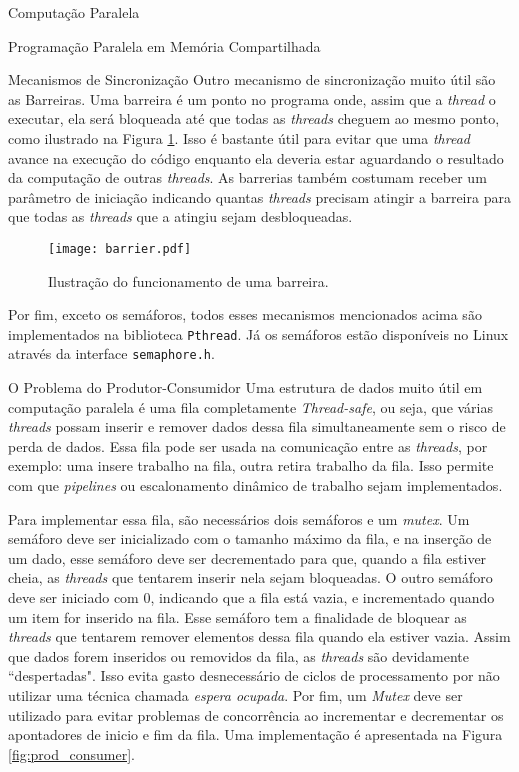 \begin{section}{Computação Paralela}
\begin{subsection}{Programação Paralela em Memória Compartilhada}
\begin{subsubsection}{Mecanismos de Sincronização}
Outro mecanismo de sincronização muito útil são as Barreiras. Uma barreira
é um ponto no programa onde, assim que a \textit{thread} o executar, ela
será bloqueada até que todas as \textit{threads} cheguem ao mesmo ponto, como
ilustrado na Figura \ref{fig:barrier}.
Isso é bastante útil para evitar que uma \textit{thread} avance na execução
do código enquanto ela deveria estar aguardando o resultado da computação
de outras \textit{threads}. As barrerias também costumam receber um parâmetro
de iniciação indicando quantas \textit{threads} precisam atingir a
barreira para que todas as \textit{threads} que a atingiu sejam desbloqueadas.

\begin{figure}[ht]
 \centering
 \texttt{[image: barrier.pdf]}
 \caption{Ilustração do funcionamento de uma barreira.}
 \label{fig:barrier}
\end{figure}


Por fim, exceto os semáforos, todos esses mecanismos mencionados acima são
implementados na biblioteca \texttt{Pthread}. Já os semáforos estão disponíveis
no Linux através da interface \texttt{semaphore.h}.

\end{subsubsection}

\begin{subsubsection}{O Problema do Produtor-Consumidor}
    Uma estrutura de dados muito útil em computação paralela
é uma fila completamente \textit{Thread-safe}, ou seja,
que várias \textit{threads} possam inserir e remover dados dessa
fila simultaneamente sem o risco de perda de dados. Essa fila
pode ser usada na comunicação entre as \textit{threads}, por
exemplo: uma insere trabalho na fila, outra retira trabalho da
fila. Isso permite com que \textit{pipelines} ou escalonamento
dinâmico de trabalho sejam implementados.

Para implementar essa fila, são necessários dois semáforos e um
\textit{mutex}. Um semáforo deve ser inicializado com o tamanho máximo
da fila, e na inserção de um dado, esse semáforo deve ser decrementado
para que, quando a fila estiver cheia, as \textit{threads} que tentarem
inserir nela sejam bloqueadas. O outro semáforo deve ser iniciado com
0, indicando que a fila está vazia, e incrementado quando um item for
inserido na fila. Esse semáforo tem a finalidade de
bloquear as \textit{threads} que tentarem remover elementos dessa
fila quando ela estiver vazia. Assim que dados forem inseridos ou removidos
da fila, as \textit{threads} são devidamente ``despertadas". Isso evita gasto
desnecessário de ciclos de processamento por não utilizar uma técnica
chamada \textit{espera ocupada}. Por fim, um \textit{Mutex} deve ser
utilizado para evitar problemas de concorrência ao incrementar e
decrementar os apontadores de inicio e fim da fila. Uma implementação
é apresentada na Figura \ref{fig:prod_consumer}.


\end{subsubsection}
\end{subsection}
\end{section}
